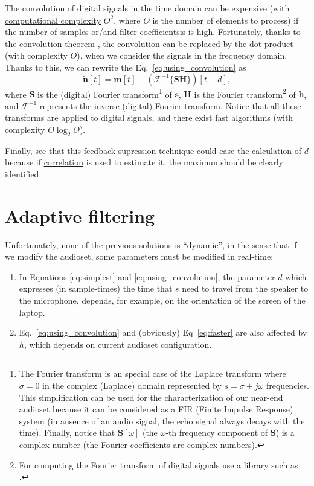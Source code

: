 The convolution of digital signals in the time domain can be expensive
(with
\href{https://en.wikipedia.org/wiki/Computational_complexity_theory}{computational
  complexity} $O^2$, where $O$ is the number of elements to process)
if the number of samples or/and filter coefficientsis is
high. Fortunately, thanks to the
\href{https://en.wikipedia.org/wiki/Convolution}{convolution theorem}
\cite{kovacevic2013fourier,Oppenheim2}, the convolution can be
replaced by the \href{https://en.wikipedia.org/wiki/Dot_product}{dot
  product} (with complexity $O$), when we consider the signals in the
frequency domain. Thanks to this, we can rewrite the
Eq.~\eqref{eq:using_convolution} as
\begin{equation}
  \tilde{\mathbf n}[t] = {\mathbf m}[t] - ({\mathcal F}^{-1}\{{\mathbf S}{\mathbf H}\})[t-d],
  \label{eq:faster}
\end{equation}
where ${\mathbf S}$ is the (digital) Fourier transform\footnote{The
Fourier transform is an special case of the Laplace transform where
$\sigma=0$ in the complex (Laplace) domain represented by
$s=\sigma+j\omega$ frequencies. This simplification can be used for
the characterization of our near-end audioset because it can be
considered as a FIR (Finite Impulse Response) system (in ausence of an
audio signal, the echo signal always decays with the time). Finally,
notice that ${\mathbf S}[\omega]$ (the $\omega$-th frequency component
of ${\mathbf S}$) is a complex number (the Fourier coefficients are
complex numbers).} of ${\mathbf s}$, ${\mathbf H}$ is the Fourier
transform\footnote{For computing the Fourier transform of digital
signals use a library such as
\href{https://numpy.org/doc/2.1/reference/routines.fft.html}{}.}
of ${\mathbf h}$, and ${\mathcal F}^{-1}$ represents the inverse
(digital) Fourier transform. Notice that all these transforms are
applied to digital signals, and there exist fast algorithms (with
complexity $O\log_2O$).

Finally, see that this feedback supression technique could ease the
calculation of $d$ because if
\href{https://en.wikipedia.org/wiki/Correlation}{correlation} is used
to estimate it, the maximun should be clearly identified.

\section{Adaptive filtering}
Unfortunately, none of the previous solutions is ``dynamic'', in the
sense that if we modify the audioset, some parameters must be modified
in real-time:
\begin{enumerate}
\item In Equations \eqref{eq:simplest} and
  \eqref{eq:using_convolution}, the parameter $d$ which expresses (in
  sample-times) the time that $s$ need to travel from the speaker to
  the microphone, depends, for example, on the orientation of the
  screen of the laptop.
\item Eq.~\eqref{eq:using_convolution} and (obviously)
  Eq~\eqref{eq:faster} are also affected by $h$, which depends on
  current audioset configuration.
\end{enumerate}

